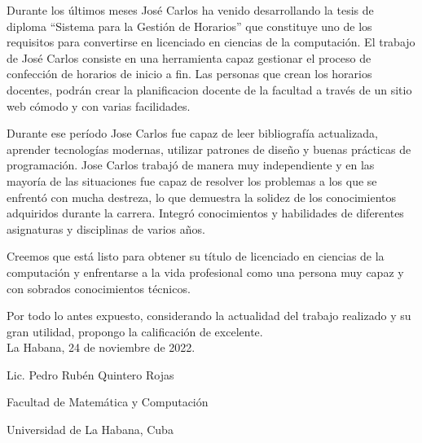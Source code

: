 \begin{opinion}
	Durante los últimos meses José Carlos ha venido desarrollando la tesis de diploma “Sistema para la Gestión de Horarios”  que constituye uno de los requisitos para convertirse en licenciado en ciencias de la computación. El trabajo de José Carlos consiste en una herramienta capaz gestionar el proceso de confección de horarios de inicio a fin. Las personas que crean los horarios docentes, podrán crear la planificacion docente de la facultad a través de un sitio web cómodo y con varias facilidades. 

	
	Durante ese período Jose Carlos fue capaz de leer bibliografía actualizada, aprender tecnologías modernas, utilizar patrones de diseño y buenas prácticas de programación. Jose Carlos trabajó de manera muy independiente y en las mayoría de las situaciones fue capaz de resolver los problemas a los que se enfrentó con mucha destreza, lo que demuestra la solidez de los conocimientos adquiridos durante la carrera. Integró conocimientos y habilidades de diferentes asignaturas y disciplinas de varios años.

	
	Creemos que está listo para obtener su título de licenciado en ciencias de la computación y enfrentarse a la vida profesional como una persona muy capaz y con sobrados conocimientos técnicos.

	
	Por todo lo antes expuesto, considerando la actualidad del trabajo realizado y su gran utilidad, propongo la calificación de excelente.\\
	

	La Habana, 24 de noviembre de 2022.
%	

	Lic. Pedro Rubén Quintero Rojas
	
	Facultad de Matemática y Computación	
	
	Universidad de La Habana, Cuba
	
\end{opinion}